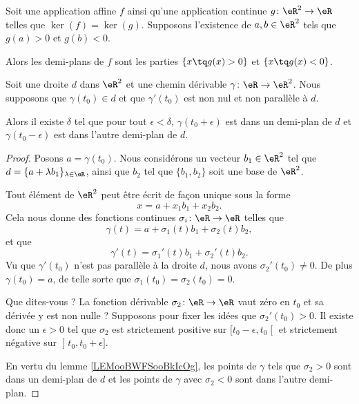 \begin{lemma}       \label{LEMooURPNooYRsuaI}
	Soit une application affine \( f\) ainsi qu'une application continue \( g\colon \eR^2\to \eR\) telles que \( \ker(f)=\ker(g)\). Supposons l'existence de \( a,b\in \eR^2\) tels que \( g(a)>0\) et \( g(b)<0\).

	Alors les demi-plans de \( f\) sont les parties \( \{ x\tq g(x)>0 \}\) et \( \{ x\tq g(x)<0 \}\).
\end{lemma}

\begin{proposition}     \label{PROPooTPHKooXnpJaV}
	Soit une droite \( d\) dans \( \eR^2\) et une chemin dérivable \( \gamma\colon \eR\to \eR^2\). Nous supposons que \( \gamma(t_0)\in d\) et que \( \gamma'(t_0)\) est non nul et non parallèle à \( d\).

	Alors il existe \( \delta\) tel que pour tout \( \epsilon<\delta\), \( \gamma(t_0+\epsilon)\) est dans un demi-plan de \( d\) et \( \gamma(t_0-\epsilon)\) est dans l'autre demi-plan de \( d\).
\end{proposition}

\begin{proof}
	Posons \( a=\gamma(t_0)\). Nous considérons un vecteur \( b_1\in \eR^2\) tel que \( d=\{ a+\lambda b_1 \}_{\lambda\in \eR}\), ainsi que \( b_2\) tel que \( \{ b_1,b_2 \}\) soit une base de \( \eR^2\).

	Tout élément de \( \eR^2\) peut être écrit de façon unique sous la forme
	\begin{equation}
		x=a+x_1b_1+x_2b_2.
	\end{equation}
	Cela nous donne des fonctions continues \( \sigma_i\colon \eR\to \eR\) telles que
	\begin{equation}
		\gamma(t)=a+\sigma_1(t)b_1+\sigma_2(t)b_2,
	\end{equation}
	et que
	\begin{equation}
		\gamma'(t)=\sigma_1'(t)b_1+\sigma_2'(t)b_2.
	\end{equation}
	Vu que \( \gamma'(t_0)\) n'est pas parallèle à la droite \( d\), nous avons \( \sigma_2'(t_0)\neq 0\). De plus \( \gamma(t_0)=a\), de telle sorte que \( \sigma_1(t_0)=\sigma_2(t_0)=0\).

	Que dites-vous ? La fonction dérivable \( \sigma_2\colon \eR\to \eR\) vaut zéro en \( t_0\) et sa dérivée y est non nulle ? Supposons pour fixer les idées que \( \sigma_2'(t_0)>0\). Il existe donc un \( \epsilon>0\) tel que \( \sigma_2\) est strictement positive sur \( \mathopen[ t_0-\epsilon , t_0 \mathclose[\) et strictement négative sur \( \mathopen] t_0 , t_0+\epsilon \mathclose]\).

	En vertu du lemme \ref{LEMooBWFSooBkIcOg}, les points de \( \gamma\) tels que \( \sigma_2>0\) sont dans un demi-plan de \( d\) et les points de \( \gamma\) avec \( \sigma_2<0\) sont dans l'autre demi-plan.
\end{proof}


